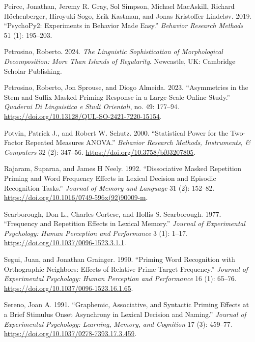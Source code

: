 \documentclass[
]{interact}
\newlength{\cslhangindent}
\newenvironment{CSLReferences}[2] %
 {\begin{list}{}{%
  \setlength{\itemindent}{0pt}
  \setlength{\leftmargin}{0pt}
  \setlength{\parsep}{0pt}
  \ifodd #1
   \setlength{\leftmargin}{\cslhangindent}
   \setlength{\itemindent}{-1\cslhangindent}
  \fi
  \setlength{\itemsep}{#2\baselineskip}}}
 {\end{list}}
\begin{document}
\begin{CSLReferences}{1}{0}
Peirce, Jonathan, Jeremy R. Gray, Sol Simpson, Michael MacAskill,
Richard Höchenberger, Hiroyuki Sogo, Erik Kastman, and Jonas Kristoffer
Lindeløv. 2019. {``PsychoPy2: Experiments in Behavior Made Easy.''}
\emph{Behavior Research Methods} 51 (1): 195--203.

Petrosino, Roberto. 2024. \emph{The Linguistic Sophistication of
Morphological Decomposition: More Than Islands of Regularity}.
Newcastle, UK: Cambridge Scholar Publishing.

Petrosino, Roberto, Jon Sprouse, and Diogo Almeida. 2023. {``Asymmetries
in the Stem and Suffix Masked Priming Response in a Large-Scale Online
Study.''} \emph{Quaderni Di Linguistica e Studi Orientali}, no. 49:
177--94. \url{https://doi.org/10.13128/QUL-SO-2421-7220-15154}.

Potvin, Patrick J., and Robert W. Schutz. 2000. {``Statistical Power for
the Two-Factor Repeated Measures ANOVA.''} \emph{Behavior Research
Methods, Instruments, \& Computers} 32 (2): 347--56.
\url{https://doi.org/10.3758/bf03207805}.

Rajaram, Suparna, and James H Neely. 1992. {``Dissociative Masked
Repetition Priming and Word Frequency Effects in Lexical Decision and
Episodic Recognition Tasks.''} \emph{Journal of Memory and Language} 31
(2): 152--82. \url{https://doi.org/10.1016/0749-596x(92)90009-m}.

Scarborough, Don L., Charles Cortese, and Hollis S. Scarborough. 1977.
{``Frequency and Repetition Effects in Lexical Memory.''} \emph{Journal
of Experimental Psychology: Human Perception and Performance} 3 (1):
1--17. \url{https://doi.org/10.1037/0096-1523.3.1.1}.

Segui, Juan, and Jonathan Grainger. 1990. {``Priming Word Recognition
with Orthographic Neighbors: Effects of Relative Prime-Target
Frequency.''} \emph{Journal of Experimental Psychology: Human Perception
and Performance} 16 (1): 65--76.
\url{https://doi.org/10.1037/0096-1523.16.1.65}.

Sereno, Joan A. 1991. {``Graphemic, Associative, and Syntactic Priming
Effects at a Brief Stimulus Onset Asynchrony in Lexical Decision and
Naming.''} \emph{Journal of Experimental Psychology: Learning, Memory,
and Cognition} 17 (3): 459--77.
\url{https://doi.org/10.1037/0278-7393.17.3.459}.


\end{CSLReferences}
\end{document}
